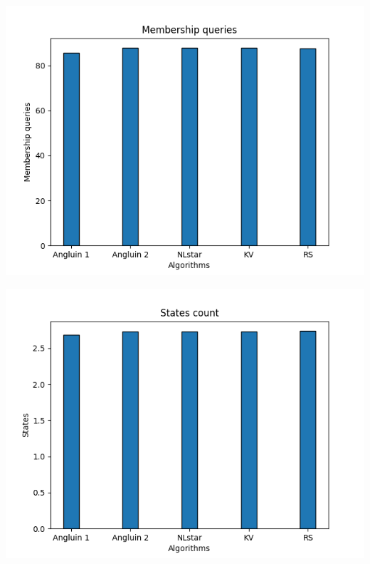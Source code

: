 \includegraphics[scale=0.75]{figures/average_membership.png}

\includegraphics[scale=0.75]{figures/average_stateCount.png}